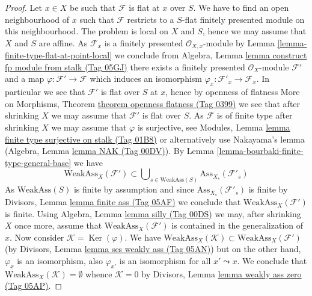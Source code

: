 \documentclass{amsart}
\theoremstyle{plain}
\theoremstyle{definition}
\theoremstyle{remark}
\numberwithin{equation}{subsection}
\def\Ker{\mathop{\mathrm{Ker}}}
\begin{document}
\begin{proof}
Let $x \in X$ be such that $\mathcal{F}$ is flat at $x$ over $S$.
We have to find an open neighbourhood of $x$ such that $\mathcal{F}$ restricts
to a $S$-flat finitely presented module on this neighbourhood.
The problem is local on $X$ and $S$, hence we may assume that $X$ and $S$
are affine. As $\mathcal{F}_x$ is a finitely presented
$\mathcal{O}_{X, x}$-module by
Lemma \ref{lemma-finite-type-flat-at-point-local}
we conclude from
Algebra, Lemma \href{https://stacks.math.columbia.edu/tag/05GJ}{lemma construct fp module from stalk (Tag 05GJ)}
there exists a finitely presented $\mathcal{O}_X$-module $\mathcal{F}'$
and a map $\varphi : \mathcal{F}' \to \mathcal{F}$ which induces
an isomorphism $\varphi_x : \mathcal{F}'_x \to \mathcal{F}_x$. In particular
we see that $\mathcal{F}'$ is flat over $S$ at $x$, hence by openness
of flatness
More on Morphisms, Theorem \href{https://stacks.math.columbia.edu/tag/0399}{theorem openness flatness (Tag 0399)}
we see that after shrinking $X$ we may assume that
$\mathcal{F}'$ is flat over $S$. As $\mathcal{F}$ is of finite type
after shrinking $X$ we may assume that $\varphi$ is surjective, see
Modules, Lemma \href{https://stacks.math.columbia.edu/tag/01B8}{lemma finite type surjective on stalk (Tag 01B8)}
or alternatively use Nakayama's lemma
(Algebra, Lemma \href{https://stacks.math.columbia.edu/tag/00DV}{lemma NAK (Tag 00DV)}).
By
Lemma \ref{lemma-bourbaki-finite-type-general-base}
we have
$$
\text{WeakAss}_X(\mathcal{F}') \subset
\bigcup\nolimits_{s \in \text{WeakAss}(S)} \text{Ass}_{X_s}(\mathcal{F}'_s)
$$
As $\text{WeakAss}(S)$ is finite by assumption and since
$\text{Ass}_{X_s}(\mathcal{F}'_s)$ is finite by
Divisors, Lemma \href{https://stacks.math.columbia.edu/tag/05AF}{lemma finite ass (Tag 05AF)}
we conclude that $\text{WeakAss}_X(\mathcal{F}')$ is finite. Using
Algebra, Lemma \href{https://stacks.math.columbia.edu/tag/00DS}{lemma silly (Tag 00DS)}
we may, after shrinking $X$ once more, assume that
$\text{WeakAss}_X(\mathcal{F}')$ is contained in the generalization
of $x$. Now consider $\mathcal{K} = \Ker(\varphi)$. We have
$\text{WeakAss}_X(\mathcal{K}) \subset \text{WeakAss}_X(\mathcal{F}')$
(by
Divisors, Lemma \href{https://stacks.math.columbia.edu/tag/05AN}{lemma ses weakly ass (Tag 05AN)})
but on the other hand, $\varphi_x$ is an isomorphism, also $\varphi_{x'}$
is an isomorphism for all $x' \leadsto x$. We conclude that
$\text{WeakAss}_X(\mathcal{K}) = \emptyset$ whence
$\mathcal{K} = 0$ by
Divisors, Lemma \href{https://stacks.math.columbia.edu/tag/05AP}{lemma weakly ass zero (Tag 05AP)}.
\end{proof}
\end{document}
